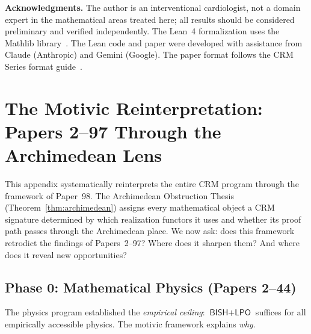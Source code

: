 \documentclass[11pt,a4paper]{article}
\theoremstyle{plain}
\theoremstyle{definition}
\newcommand{\BISH}{\textsf{BISH}}
\newcommand{\LPO}{\textsf{LPO}}
\begin{document}
\bigskip
\noindent\textbf{Acknowledgments.} The author is an interventional cardiologist, not a domain expert in the mathematical areas treated here; all results should be considered preliminary and verified independently. The Lean~4 formalization uses the Mathlib library~\cite{mathlib}. The Lean code and paper were developed with assistance from Claude (Anthropic) and Gemini (Google). The paper format follows the CRM Series format guide~\cite{formatguide}.


\appendix

\section{The Motivic Reinterpretation: Papers 2--97 Through the Archimedean Lens}\label{app:reinterpretation}

This appendix systematically reinterprets the entire CRM program through the framework of Paper~98. The Archimedean Obstruction Thesis (Theorem~\ref{thm:archimedean}) assigns every mathematical object a CRM signature determined by which realization functors it uses and whether its proof path passes through the Archimedean place. We now ask: does this framework retrodict the findings of Papers~2--97? Where does it sharpen them? And where does it reveal new opportunities?

\subsection{Phase 0: Mathematical Physics (Papers 2--44)}\label{app:physics}

The physics program established the \emph{empirical ceiling}: $\BISH + \LPO$ suffices for all empirically accessible physics. The motivic framework explains \emph{why}.
\end{document}
